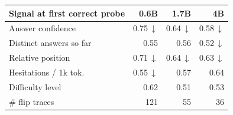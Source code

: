 \begin{tabular}{lrrr}
\toprule
Signal at first correct probe & 0.6B & 1.7B & 4B \\
\midrule
Answer confidence & 0.75\,$\downarrow$ & 0.64\,$\downarrow$ & 0.58\,$\downarrow$ \\
Distinct answers so far & 0.55 & 0.56 & 0.52\,$\downarrow$ \\
Relative position & 0.71\,$\downarrow$ & 0.64\,$\downarrow$ & 0.63\,$\downarrow$ \\
Hesitations / 1k tok. & 0.55\,$\downarrow$ & 0.57 & 0.64 \\
Difficulty level & 0.62 & 0.51 & 0.53 \\
\midrule
\# flip traces & 121 & 55 & 36 \\
\bottomrule
\end{tabular}
